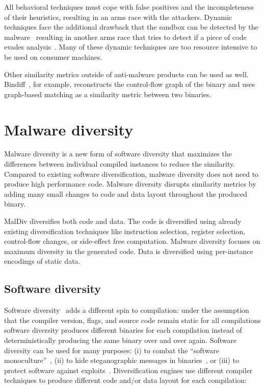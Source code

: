 \documentclass[10pt, preprint]{sigplanconf}
\begin{document}
All behavioral techniques must cope with false positives and the incompleteness
of their heuristics, resulting in an arms race with the attackers. Dynamic
techniques face the additional drawback that the sandbox can be detected by the
malware~\cite{ferrie06symantec, paleari09woot, raffetseder07isc,
rutkowska04blog, chen08dsn, garfinkel07hotos} resulting in another arms race
that tries to detect if a piece of code evades analysis~\cite{balzarotti10ndss,
ferrie06symantec, johnson11sp, kang09vmsec,kolbitsch+11,lau10cv,
lindorfer11raid}. Many of these dynamic techniques are too resource intensive
to be used on consumer machines.

Other similarity metrics outside of anti-malware products can be used as well.
Bindiff~\cite{flake04dimva}, for example, reconstructs the control-flow graph
of the binary and uses graph-based matching as a similarity metric between two
binaries.


\section{Malware diversity}\label{sec:maldiv}

Malware diversity is a new form of software diversity that maximizes the
differences between individual compiled instances to reduce the similarity.
Compared to existing software diversification, malware diversity does not need
to produce high performance code. Malware diversity disrupts similarity metrics
by adding many small changes to code and data layout throughout the produced
binary.

MalDiv diversifies both code and data. The code is diversified using already
existing diversification techniques like instruction selection, register
selection, control-flow changes, or side-effect free computation. Malware
diversity focuses on maximum diversity in the generated code. Data is
diversified using per-instance encodings of static data.


\subsection{Software diversity}

Software diversity~\cite{cohen93csec} adds a different spin to compilation:
under the assumption that the compiler version, flags, and source code remain
static for all compilations software diversity produces different binaries for
each compilation instead of deterministically producing the same binary over
and over again. Software diversity can be used for many purposes: (i) to combat
the ``software monoculture''~\cite{geer03cciar, franz10npsw, multicompiler},
(ii) to hide steganographic messages in binaries~\cite{elkhalil04icics}, or
(iii) to protect software against exploits~\cite{cohen93csec, forrest97hotos,
cox06usenix, franz10npsw, kisserli07cobassa}. Diversification engines use
different compiler techniques to produce different code and/or data layout
for each compilation:
\end{document}
